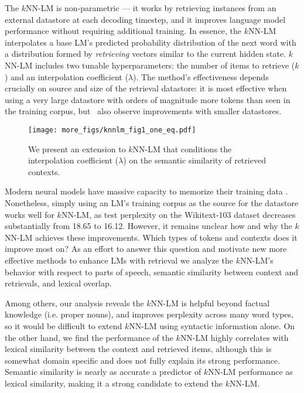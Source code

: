 \documentclass[11pt]{article}
\begin{document}
The $k$NN-LM is non-parametric --- it works by retrieving instances from an external datastore at each decoding timestep, and it improves language model performance without requiring additional training. In essence, the $k$NN-LM interpolates a base LM's predicted probability distribution of the next word with a distribution formed by \emph{retrieving} vectors similar to the current hidden state.
$k$NN-LM includes two tunable hyperparameters: the number of items to retrieve ($k$) and an interpolation coefficient ($\lambda$). The method's effectiveness depends crucially on source and size of the retrieval datastore: it is most effective when using a very large datastore with orders of magnitude more tokens than seen in the training corpus, but~\citet{khandelwal20generalization} also observe improvements with smaller datastores.

\begin{figure}[!t]
\centering
\texttt{[image: more\_figs/knnlm\_fig1\_one\_eq.pdf]}
\caption{We present an extension to $k$NN-LM that conditions the interpolation coefficient ($\lambda$) on the semantic similarity of retrieved contexts.}
\label{fig:adaptive_coeff}
\end{figure}

Modern neural models have massive capacity to memorize their training data \cite{Zhang2017UnderstandingDL}. Nonetheless, simply using an LM's training corpus as the source for the datastore works well for $k$NN-LM, as test perplexity on the Wikitext-103 dataset decreases substantially from 18.65 to 16.12. However, it remains unclear how and why the $k$NN-LM achieves these improvements. Which types of tokens and contexts does it improve most on? As an effort to answer this question and motivate new more effective methods to enhance LMs with retrieval we analyze the $k$NN-LM's behavior with respect to parts of speech, semantic similarity between context and retrievals, and lexical overlap. 

Among others, our analysis reveals the $k$NN-LM is helpful beyond factual knowledge (i.e. proper nouns), and improves perplexity across many word types, so it would be difficult to extend $k$NN-LM using syntactic information alone. On the other hand, we find the performance of the $k$NN-LM highly correlates with lexical similarity between the context and retrieved items, although this is somewhat domain specific and does not fully explain its strong performance. Semantic similarity is nearly as accurate a predictor of $k$NN-LM performance as lexical similarity, making it a strong candidate to extend the $k$NN-LM.
\end{document}
